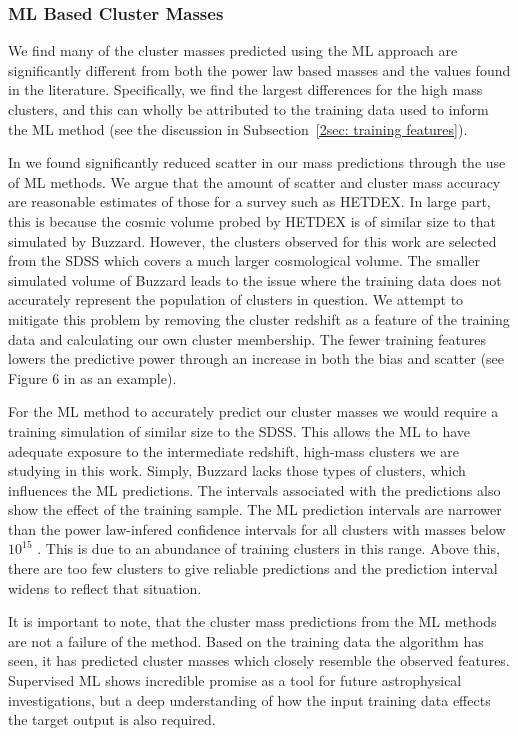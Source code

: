 \subsubsection{ML Based Cluster Masses}
We find many of the cluster masses predicted using the ML approach are significantly different from both the power law based masses and the values found in the literature. Specifically, we find the largest differences for the high mass clusters, and this can wholly be attributed to the training data used to inform the ML method (see the discussion in Subsection~\ref{2sec: training features}). 

In  we found significantly reduced scatter in our mass predictions through the use of ML methods. We argue that the amount of scatter and cluster mass accuracy are reasonable estimates of those for a survey such as HETDEX. In large part, this is because the cosmic volume probed by HETDEX is of similar size to that simulated by Buzzard. However, the clusters observed for this work are selected from the SDSS which covers a much larger cosmological volume. The smaller simulated volume of Buzzard leads to the issue where the training data does not accurately represent the population of clusters in question. We attempt to mitigate this problem by removing the cluster redshift as a feature of the training data and calculating our own cluster membership. The fewer training features lowers the predictive power through an increase in both the bias and scatter (see Figure 6 in  as an example). 

For the ML method to accurately predict our cluster masses we would require a training simulation of similar size to the SDSS. This allows the ML to have adequate exposure to the intermediate redshift, high-mass clusters we are studying in this work. Simply, Buzzard lacks those types of clusters, which influences the ML predictions. The intervals associated with the predictions also show the effect of the training sample. The ML prediction intervals are narrower than the power law-infered confidence intervals for all clusters with masses below $10^{15}$ \Msol. This is due to an abundance of training clusters in this range. Above this, there are too few clusters to give reliable predictions and the prediction interval widens to reflect that situation. 

It is important to note, that the cluster mass predictions from the ML methods are not a failure of the method. Based on the training data the algorithm has seen, it has predicted cluster masses which closely resemble the observed features. Supervised ML shows incredible promise as a tool for future astrophysical investigations, but a deep understanding of how the input training data effects the target output is also required.

